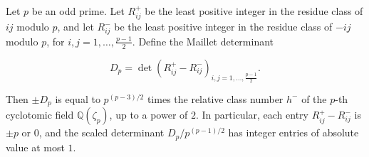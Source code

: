 Let $p$ be an odd prime. Let $R_{ij}^+$ be the least positive integer in the residue class of $ij$ modulo $p$, and let $R_{ij}^-$ be the least positive integer in the residue class of $-ij$ modulo $p$, for $i,j = 1,\dots,\frac{p-1}{2}$. Define the Maillet determinant

$$D_p = \det\left( R_{ij}^+ - R_{ij}^- \right)_{i,j=1,\dots,\frac{p-1}{2}}.$$

Then $\pm D_p$ is equal to $p^{(p-3)/2}$ times the relative class number $h^-$ of the $p$-th cyclotomic field $\mathbb{Q}(\zeta_p)$, up to a power of $2$. In particular, each entry $R_{ij}^+ - R_{ij}^-$ is $\pm p$ or $0$, and the scaled determinant $D_p / p^{(p-1)/2}$ has integer entries of absolute value at most $1$.
